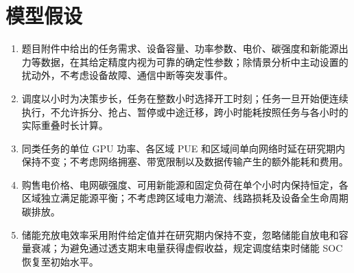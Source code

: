 \section{模型假设}

\begin{enumerate}
\item 题目附件中给出的任务需求、设备容量、功率参数、电价、碳强度和新能源出力等数据，在其给定精度内视为可靠的确定性参数；除情景分析中主动设置的扰动外，不考虑设备故障、通信中断等突发事件。
\item 调度以小时为决策步长，任务在整数小时选择开工时刻；任务一旦开始便连续执行，不允许拆分、抢占、暂停或中途迁移，跨小时能耗按照任务与各小时的实际重叠时长计算。
\item 同类任务的单位 GPU 功率、各区域 PUE 和区域间单向网络时延在研究期内保持不变；不考虑网络拥塞、带宽限制以及数据传输产生的额外能耗和费用。
\item 购售电价格、电网碳强度、可用新能源和固定负荷在单个小时内保持恒定，各区域独立满足能源平衡；不考虑跨区域电力潮流、线路损耗及设备全生命周期碳排放。
\item 储能充放电效率采用附件给定值并在研究期内保持不变，忽略储能自放电和容量衰减；为避免通过透支期末电量获得虚假收益，规定调度结束时储能 SOC 恢复至初始水平。
\end{enumerate}
